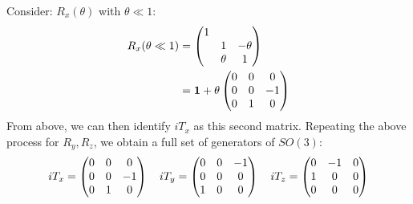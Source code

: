 Consider: $R_x(\theta)$ with $\theta\ll 1$:
\begin{align*}
  R_x(\theta\ll1)&=\pmqty{1\\&1&-\theta\\&\theta&1}\\
  &=\bm{1}+\theta\pmqty{0&0&0\\0&0&-1\\0&1&0}
\end{align*}
From above, we can then identify $iT_x$ as this second matrix. Repeating the above process for $R_y,R_z$, we obtain a full set of generators of $SO(3)$:
\begin{align*}
  iT_x=\pmqty{0&0&0\\0&0&-1\\0&1&0}\quad
  iT_y=\pmqty{0&0&-1\\0&0&0\\1&0&0}\quad
  iT_z=\pmqty{0&-1&0\\1&0&0\\0&0&0}
\end{align*}


